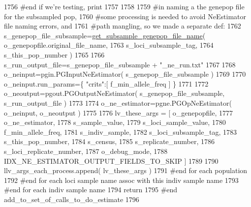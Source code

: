 \begin{DoxyCode}
1756                 \textcolor{comment}{#end if we're testing, print }
1757                 
1758 
1759                 \textcolor{comment}{#in naming a the genepop file for the subsampled pop,}
1760                 \textcolor{comment}{#some processing is needed to avoid NeEstimator file naming errors, and}
1761                 \textcolor{comment}{#path mangling, so we made a separate def:}
1762                 s\_genepop\_file\_subsample=\hyperlink{namespacenegui_1_1pgdriveneestimator_a9359fcbe384546efd152c8d06fec5aa5}{get\_subsample\_genepop\_file\_name}( 
      o\_genepopfile.original\_file\_name, 
1763                                                         s\_loci\_subsample\_tag, 
1764                                                         s\_this\_pop\_number )
1765 
1766                 s\_run\_output\_file=s\_genepop\_file\_subsample + \textcolor{stringliteral}{"\_ne\_run.txt"}
1767 
1768                 o\_neinput=pgin.PGInputNeEstimator( s\_genepop\_file\_subsample )
1769 
1770                 o\_neinput.run\_params=\{ \textcolor{stringliteral}{"crits"}:[ f\_min\_allele\_freq ]  \}
1771 
1772                 o\_neoutput=pgout.PGOutputNeEstimator( s\_genepop\_file\_subsample, s\_run\_output\_file ) 
1773 
1774                 o\_ne\_estimator=pgne.PGOpNeEstimator( o\_neinput, o\_neoutput ) 
1775                 
1776                 lv\_these\_args = [ o\_genepopfile,  
1777                                     o\_ne\_estimator, 
1778                                     s\_sample\_value, 
1779                                     s\_loci\_sample\_value,
1780                                     f\_min\_allele\_freq, 
1781                                     s\_indiv\_sample, 
1782                                     s\_loci\_subsample\_tag,
1783                                     s\_this\_pop\_number, 
1784                                     s\_census,
1785                                     s\_replicate\_number, 
1786                                     s\_loci\_replicate\_number,
1787                                     o\_debug\_mode,
1788                                     IDX\_NE\_ESTIMATOR\_OUTPUT\_FIELDS\_TO\_SKIP ]
1789 
1790                 llv\_args\_each\_process.append( lv\_these\_args )
1791             \textcolor{comment}{#end for each population}
1792         \textcolor{comment}{#end for each loci sample name assoc with this indiv sample name}
1793     \textcolor{comment}{#end for each indiv sample name}
1794     \textcolor{keywordflow}{return}
1795 \textcolor{comment}{#end add\_to\_set\_of\_calls\_to\_do\_estimate}
1796 
\end{DoxyCode}
